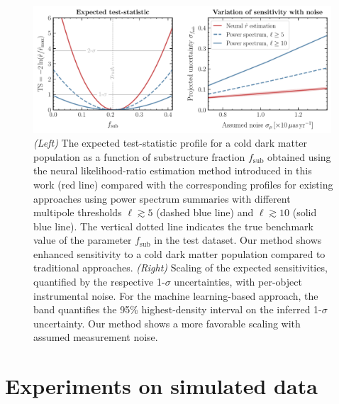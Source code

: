 \documentclass[preprint]{article}
\begin{document}

\begin{figure}[!htbp]
\centering
\includegraphics[width=0.99\textwidth]{figures/results}
\caption{\emph{(Left)} The expected test-statistic profile for a cold dark matter population as a function of substructure fraction $f_\mathrm{sub}$ obtained using the neural likelihood-ratio estimation method introduced in this work (red line) compared with the corresponding profiles for existing approaches using power spectrum summaries with different multipole thresholds $\ell \gtrsim 5$ (dashed blue line) and $\ell \gtrsim 10$ (solid blue line). The vertical dotted line indicates the true benchmark value of the parameter $f_\mathrm{sub}$ in the test dataset. Our method shows enhanced sensitivity to a cold dark matter population compared to traditional approaches. \emph{(Right)} Scaling of the expected sensitivities, quantified by the respective 1-$\sigma$ uncertainties, with per-object instrumental noise. For the machine learning-based approach, the band quantifies the 95\% highest-density interval on the inferred 1-$\sigma$ uncertainty. Our method shows a more favorable scaling with assumed measurement noise.}
\label{fig:experiment}
\end{figure}
 

\section{Experiments on simulated data}
\label{sec:experiments}
\end{document}
